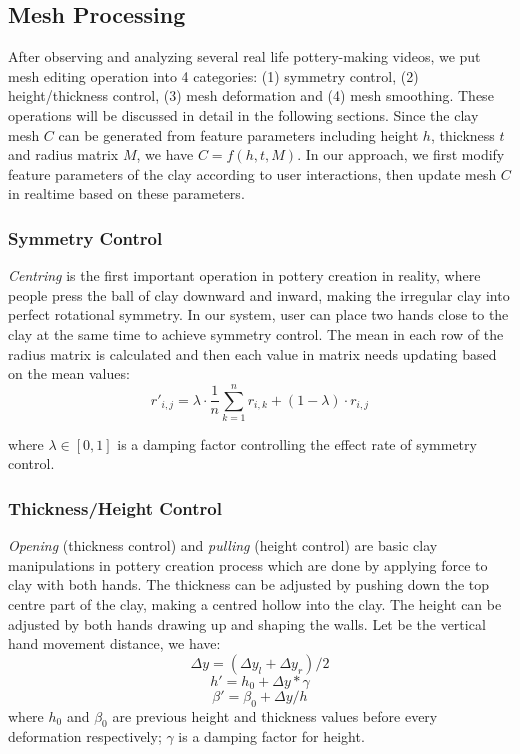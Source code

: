 \subsection{Mesh Processing}
\label{sec:4.2}
After observing and analyzing several real life pottery-making videos, we put mesh editing operation into 4 categories: (1) symmetry control, (2) height/thickness control, (3) mesh deformation and (4) mesh smoothing. These operations will be discussed in detail in the following sections.
Since the clay mesh $C$ can be generated from feature parameters including height $h$, thickness $t$ and radius matrix $M$, we have $ C =  f(h, t, M) $.
In our approach, we first modify feature parameters of the clay according to user interactions, then update mesh $C$  in realtime based on these parameters.

\subsubsection{Symmetry Control}
\label{sec:4.2.1}
\textit{Centring} is the first important operation in pottery creation in reality, where people press the ball of clay downward and inward, making the irregular clay into perfect rotational symmetry.
In our system, user can place two hands close to the clay at the same time to achieve symmetry control.
The mean in each row of the radius matrix is calculated and then each value in matrix needs updating based on the mean values:
\begin{equation}
r'_{i,j} = 
\lambda \cdot \frac{1}{n}\sum_{k=1}^{n} r_{i,k}
+ (1 - \lambda) \cdot r_{i,j}
\end{equation}

where $\lambda \in [0,1]$ is a damping factor controlling the effect rate of symmetry control.

\subsubsection{Thickness/Height Control}
\label{sec:4.2.2}
\textit{Opening} (thickness control) and \textit{pulling} (height control) are basic clay manipulations in pottery creation process which are done by applying force to clay with both hands. The thickness can be adjusted by pushing down the top centre part of the clay, making a centred hollow into the clay. The height can be adjusted by both hands drawing up and shaping the walls.
 Let  be the vertical hand movement distance, we have:
\begin{equation}
\Delta y = (\Delta y_{l} + \Delta y_{r})/2
\end{equation}
\begin{equation}
h' = h_{0} + \Delta y * \gamma
\end{equation}
\begin{equation}
\beta' = \beta_{0} + \Delta y/ h
\end{equation}
where $h_{0}$ and $\beta_{0}$ are previous height and thickness values before every deformation respectively; $\gamma$ is a damping factor for height.

